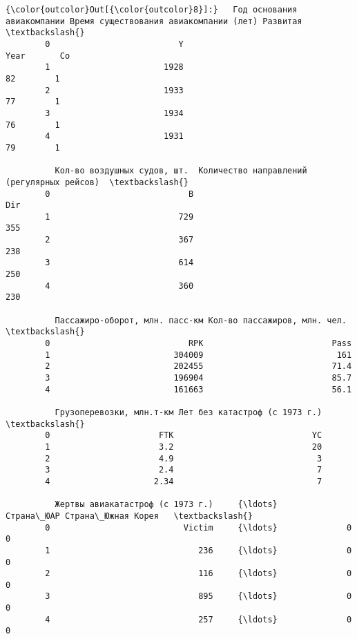 \documentclass[11pt,mathletters]{article}
\begin{document}
            \begin{Verbatim}[commandchars=\\\{\}]
{\color{outcolor}Out[{\color{outcolor}8}]:}   Год основания авиакомпании Время существования авиакомпании (лет) Развитая  \textbackslash{}
        0                          Y                                   Year       Co   
        1                       1928                                     82        1   
        2                       1933                                     77        1   
        3                       1934                                     76        1   
        4                       1931                                     79        1   
        
          Кол-во воздушных судов, шт.  Количество направлений (регулярных рейсов)  \textbackslash{}
        0                            B                                        Dir   
        1                          729                                        355   
        2                          367                                        238   
        3                          614                                        250   
        4                          360                                        230   
        
          Пассажиро-оборот, млн. пасс-км Кол-во пассажиров, млн. чел.   \textbackslash{}
        0                            RPK                          Pass   
        1                         304009                           161   
        2                         202455                          71.4   
        3                         196904                          85.7   
        4                         161663                          56.1   
        
          Грузоперевозки, млн.т-км Лет без катастроф (с 1973 г.)  \textbackslash{}
        0                      FTK                            YC   
        1                      3.2                            20   
        2                      4.9                             3   
        3                      2.4                             7   
        4                     2.34                             7   
        
          Жертвы авиакатастроф (с 1973 г.)     {\ldots}     Страна\_ЮАР Страна\_Южная Корея   \textbackslash{}
        0                           Victim     {\ldots}              0                   0   
        1                              236     {\ldots}              0                   0   
        2                              116     {\ldots}              0                   0   
        3                              895     {\ldots}              0                   0   
        4                              257     {\ldots}              0                   0   
        

\end{Verbatim}
\end{document}
